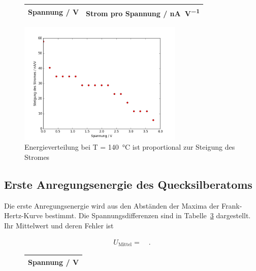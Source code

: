 \begin{figure}
	\centering
	\begin{tabular}{cc}
		Spannung / \si{\volt} & Strom pro Spannung / \si{\nano\ampere\per\volt}   \\
		\hline
		
	\end{tabular}
	\label{tab:energieverteilung_140}
\end{figure}


\begin{figure}
	\centering
	\includegraphics[width=0.7\textwidth]{build/Energieverteilung_140.png}
	\caption{Energieverteilung bei  T = \SI{140}{\celsius} ist proportional zur Steigung des Stromes}
	\label{fig:energieverteilung_140}
\end{figure}

\clearpage

\subsection{Erste Anregungsenergie des Quecksilberatoms}
Die erste Anregungsenergie wird aus den Abständen der Maxima der Frank-Hertz-Kurve bestimmt. Die Spannungsdifferenzen sind in Tabelle~\ref{tab:anregungsspannung} dargestellt. Ihr Mittelwert und deren Fehler ist

\begin{align}
	U_{\text{Mittel}} =  \quad .
\end{align}

\begin{figure}[h!]
	\centering
	\begin{tabular}{c}
		Spannung / \si{\volt}}   \\
		\hline
		
	\end{tabular}
	\label{tab:anregungsspannung}
\end{figure}

